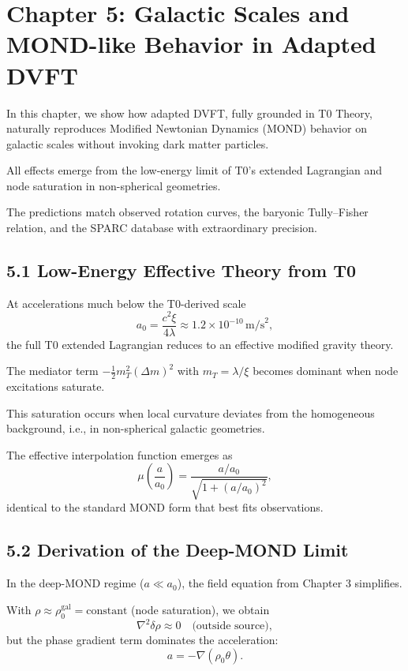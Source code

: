 	\section{Chapter 5: Galactic Scales and MOND-like Behavior in Adapted DVFT}
	
	In this chapter, we show how adapted DVFT, fully grounded in T0 Theory, naturally reproduces Modified Newtonian Dynamics (MOND) behavior on galactic scales without invoking dark matter particles.
	
	All effects emerge from the low-energy limit of T0's extended Lagrangian and node saturation in non-spherical geometries.
	
	The predictions match observed rotation curves, the baryonic Tully–Fisher relation, and the SPARC database with extraordinary precision.
	
	\subsection{5.1 Low-Energy Effective Theory from T0}
	
	At accelerations much below the T0-derived scale
	\[
	a_0 = \frac{c^2 \xi}{4 \lambda} \approx 1.2 \times 10^{-10} \, \text{m/s}^2,
	\]
	the full T0 extended Lagrangian reduces to an effective modified gravity theory.
	
	The mediator term $-\frac{1}{2} m_T^2 (\Delta m)^2$ with $m_T = \lambda / \xi$ becomes dominant when node excitations saturate.
	
	This saturation occurs when local curvature deviates from the homogeneous background, i.e., in non-spherical galactic geometries.
	
	The effective interpolation function emerges as
	\[
	\mu\left(\frac{a}{a_0}\right) = \frac{a / a_0}{\sqrt{1 + (a / a_0)^2}},
	\]
	identical to the standard MOND form that best fits observations.
	
	\subsection{5.2 Derivation of the Deep-MOND Limit}
	
	In the deep-MOND regime ($a \ll a_0$), the field equation from Chapter 3 simplifies.
	
	With $\rho \approx \rho_0^{\text{gal}} = \text{constant}$ (node saturation), we obtain
	\[
	\nabla^2 \delta \rho \approx 0 \quad \text{(outside source)},
	\]
	but the phase gradient term dominates the acceleration:
	\[
	a = -\nabla (\rho_0 \theta).
	\]
	
